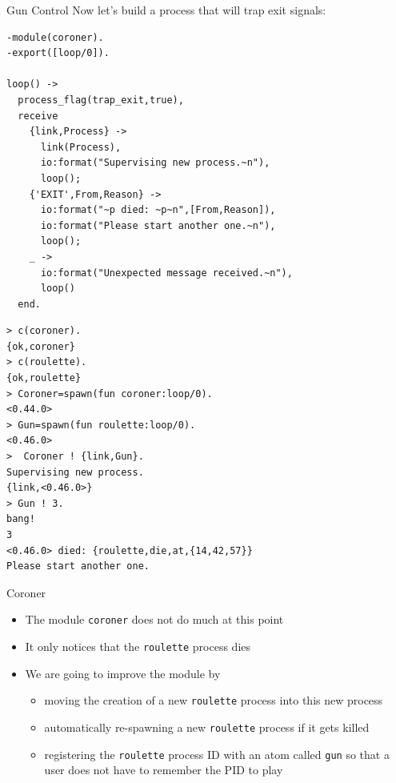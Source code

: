 \documentclass[12pt,xcolor=svgnames]{beamer}
\begin{document}
\begin{frame}{Gun Control}
Now let's build a process that will trap exit signals:
\begin{Verbatim}
-module(coroner).
-export([loop/0]).

loop() ->
  process_flag(trap_exit,true),
  receive
    {link,Process} ->
      link(Process),
      io:format("Supervising new process.~n"),
      loop();
    {'EXIT',From,Reason} ->
      io:format("~p died: ~p~n",[From,Reason]),
      io:format("Please start another one.~n"),
      loop();
    _ ->
      io:format("Unexpected message received.~n"),
      loop()	
  end.		
\end{Verbatim}

\framebreak
{}
\begin{Verbatim}
> c(coroner).
{ok,coroner}
> c(roulette).
{ok,roulette}
> Coroner=spawn(fun coroner:loop/0).
<0.44.0>
> Gun=spawn(fun roulette:loop/0).
<0.46.0>
>  Coroner ! {link,Gun}.
Supervising new process.
{link,<0.46.0>}
> Gun ! 3.
bang!
3
<0.46.0> died: {roulette,die,at,{14,42,57}}
Please start another one.
\end{Verbatim}
\end{frame}

\begin{frame}{Coroner}
\begin{itemize}
\item The module \texttt{coroner} does not do much at this point
\item It only notices that the \texttt{roulette} process dies
\item We are going to improve the module by
\begin{itemize}
\item moving the creation of a new \texttt{roulette} process into this new process
\item automatically re-spawning a new \texttt{roulette} process if it gets killed
\item registering the \texttt{roulette} process ID with an atom called \texttt{gun}
so that a user does not have to remember the PID to play
\end{itemize}
\end{itemize}
\end{frame}
\end{document}
